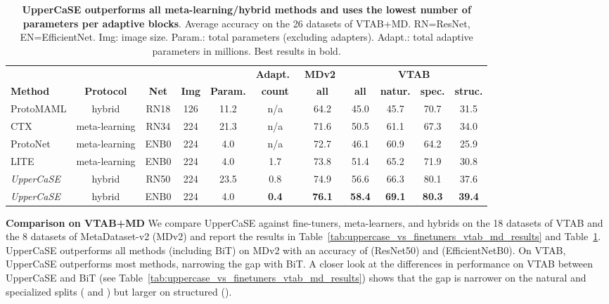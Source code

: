 \documentclass{article}
\begin{document}
\begin{table}[!h]
\caption{\textbf{UpperCaSE outperforms all meta-learning/hybrid methods and uses the lowest number of parameters per adaptive blocks}. Average accuracy on the 26 datasets of VTAB+MD. RN=ResNet, EN=EfficientNet. Img: image size. Param.: total parameters (excluding adapters). Adapt.: total adaptive parameters in millions.
Best results in bold.}
\vskip 0.1in
\begin{adjustbox}{width=1.0\textwidth,center}
\begin{tabular}{lcccccccccc}
\toprule
 & & & & & \multicolumn{1}{c}{\textbf{Adapt.}~} & \multicolumn{1}{c}{\textbf{MDv2}~} & \multicolumn{4}{c}{\textbf{VTAB}~} \\
 \cmidrule(lr){6-6} \cmidrule(lr){7-7} \cmidrule(lr){8-11}
 \textbf{Method} & \textbf{Protocol} & \textbf{Net} & \textbf{Img} & \textbf{Param.} & \textbf{count} & \textbf{all} & \textbf{all} & \textbf{natur.} & \textbf{spec.} & \textbf{struc.} \\
\midrule
ProtoMAML & hybrid & RN18 & 126 & 11.2 & n/a & 64.2 & 45.0 & 45.7 & 70.7 & 31.5 \\
CTX & meta-learning & RN34 & 224 & 21.3 & n/a & 71.6 & 50.5 & 61.1 & 67.3 & 34.0 \\
ProtoNet & meta-learning & ENB0 & 224 & 4.0 & n/a & 72.7 & 46.1 & 60.9 & 64.2 & 25.9 \\
LITE & meta-learning & ENB0 & 224 & 4.0 & 1.7 & 73.8 & 51.4 & 65.2 & 71.9 & 30.8 \\
\midrule
\emph{UpperCaSE} & hybrid & RN50 & 224 & 23.5 & 0.8 & 74.9 & 56.6 & 66.3 & 80.1 & 37.6 \\
\emph{UpperCaSE} & hybrid & ENB0 & 224 & 4.0 & \textbf{0.4} & \textbf{76.1} & \textbf{58.4} & \textbf{69.1} & \textbf{80.3} & \textbf{39.4} \\
\bottomrule
\end{tabular}
\end{adjustbox}
\label{tab:uppercase_vs_metalearners_vtab_md_results}
\end{table}

\textbf{Comparison on VTAB+MD} We compare UpperCaSE against fine-tuners, meta-learners, and hybrids on the 18 datasets of VTAB and the 8 datasets of MetaDataset-v2 (MDv2) and report the results in Table~\ref{tab:uppercase_vs_finetuners_vtab_md_results} and Table~\ref{tab:uppercase_vs_metalearners_vtab_md_results}. UpperCaSE outperforms all methods (including BiT) on MDv2 with an accuracy of  (ResNet50) and  (EfficientNetB0). On VTAB, UpperCaSE outperforms most methods, narrowing the gap with BiT. A closer look at the differences in performance on VTAB between UpperCaSE and BiT (see Table~\ref{tab:uppercase_vs_finetuners_vtab_md_results}) shows that the gap is narrower on the natural and specialized splits ( and ) but larger on structured ().
\end{document}

